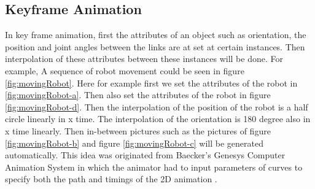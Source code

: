 \subsection{Keyframe Animation}
In key frame animation, first the attributes of an object such as orientation, the position and joint angles between the links are at set at certain instances. Then interpolation of these attributes between these instances will be done. For example, A sequence of robot movement could be seen in figure \ref{fig:movingRobot}. Here for example first we set the attributes of the robot in \ref{fig:movingRobot-a}. Then also set the attributes of the robot in figure \ref{fig:movingRobot-d}. Then the interpolation of the position of the robot is a half circle linearly in x time. The interpolation of the orientation is 180 degree also in x time linearly. Then in-between pictures such as the pictures of figure \ref{fig:movingRobot-b} and figure \ref{fig:movingRobot-c} will be generated automatically. This idea was originated from Baecker's Genesys Computer Animation System in which the animator had to input
parameters of curves to specify both the path and timings of the 2D
animation \cite{keyframe1}. 
